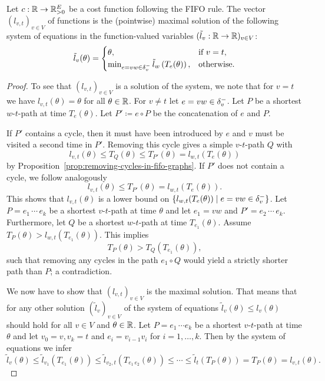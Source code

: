 \begin{proposition}\label{prop:characterization-arrival-functions}
    Let $c:\mathbb{R}\rightarrow\mathbb{R}_{>0}^E$ be a cost function following the FIFO rule.
    The vector $(l_{v,t})_{v\in V}$ of functions is the (pointwise) maximal solution of the following system of equations in the function-valued variables $(\tilde l_v: \mathbb{R} \rightarrow \mathbb{R})_{v\in V}$:
    \[
        \tilde l_v(\theta) = \begin{cases}
            \theta, &\text{if $v = t$}, \\
            \min_{\substack{
                e=vw\in\delta^-_{v}               
            }} \tilde{l}_w\left(
                T_e(\theta)
            \right), &\text{otherwise}.
        \end{cases}
    \]
\end{proposition}
\begin{proof}
    To see that $(l_{v,t})_{v\in V}$ is a solution of the system, we note that for $v = t$ we have $l_{v,t}(\theta) = \theta$ for all $\theta\in\mathbb{R}$.
    For $v\neq t$ let $e=vw\in\delta^-_{v}$.
    Let $P$ be a shortest $w$-$t$-path at time $T_{e}(\theta)$.
    Let $P'\coloneqq e\circ P$ be the concatenation of $e$ and $P$.

    If $P'$ contains a cycle, then it must have been introduced by $e$ and $v$ must be visited a second time in $P'$.
    Removing this cycle gives a simple $v$-$t$-path $Q$ with 
    \[
        l_{v,t}(\theta) \leq T_{Q}(\theta)\leq T_{P'}(\theta) = l_{w,t}(T_{e}(\theta))
    \]
    by Proposition~\ref{prop:removing-cycles-in-fifo-graphs}.
    If $P'$ does not contain a cycle, we follow analogously
    \[
        l_{v,t}(\theta) \leq T_{P'}(\theta) = l_{w,t}(T_{e}(\theta)).
    \]
    This shows that $l_{v,t}(\theta)$ is a lower bound on $\{ l_{w,t}(
        T_{e}(\theta)
    ) \mid e=vw\in\delta^-_{v}  \}$.
    Let $P = e_1\, \cdots\, e_k$ be a shortest $v$-$t$-path at time $\theta$ and let $e_1=vw$ and $P' = e_2\,\cdots\,e_k$.
    Furthermore, let $Q$ be a shortest $w$-$t$-path at time $T_{e_1}(\theta)$.
    Assume $T_{P}(\theta) > l_{w,t}(T_{e_1}(\theta))$.
    This implies
    \[
        T_{P}(\theta) > 
        T_{Q}(T_{e_1}(\theta)),
    \]
    such that removing any cycles in the path $e_1\circ Q$ would yield a strictly shorter path than $P$; a contradiction.

    We now have to show that $(l_{v,t})_{v\in V}$ is the maximal solution.
    That means that for any other solution $(\tilde l_v)_{v\in V}$ of the system of equations
     $\tilde l_{v}(\theta) \leq l_v(\theta)$ should hold for all $v\in V$ and $\theta\in\mathbb{R}$.
    Let $P = e_1 \,\cdots e_k$ be a shortest $v$-$t$-path at time $\theta$ and let $v_0 = v, v_k= t$ and $e_i = v_{i-1} v_i$ for $i=1,\dots,k$.
    Then by the system of equations we infer \[
        \tilde l_{v}(\theta) \leq \tilde l_{v_1}(T_{e_1}(\theta)) \leq \tilde l_{v_2,t}(T_{e_1\,e_2} (\theta)) \leq \cdots \leq \tilde l_{t}(T_P(\theta)) = T_P(\theta) = l_{v,t}(\theta).
    \]
\end{proof}


